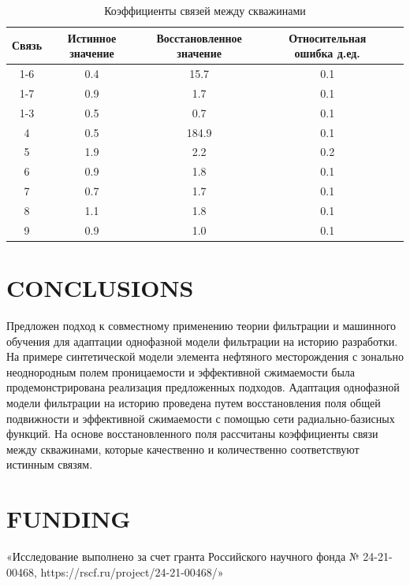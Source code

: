 \documentclass{article}
\begin{document}
	\begin{table}[h!]
	\caption{Коэффициенты связей между скважинами}	
	\label{tabl:connection}	
	\begin{center}
		\begin{tabular}{c|c|c|c|c}
			\hline
			Связь & Истинное значение & Восстановленное значение & Относительная ошибка д.ед. \\
			\hline
			1-6 & 0.4 & 15.7 & 0.1 \\
			1-7 & 0.9 & 1.7 & 0.1  \\
			1-3 & 0.5 & 0.7 & 0.1  \\
			4 & 0.5 & 184.9 & 0.1  \\
			5 & 1.9 & 2.2 & 0.2  \\
			6 & 0.9 & 1.8 & 0.1  \\
			7 & 0.7 & 1.7 & 0.1  \\
			8 & 1.1 & 1.8 & 0.1  \\
			9 & 0.9 & 1.0 & 0.1  \\
			\hline
			
		\end{tabular}
	\end{center}
\end{table}


\section{CONCLUSIONS}

Предложен подход к совместному применению теории фильтрации и машинного обучения для адаптации однофазной модели фильтрации на историю разработки. На примере синтетической модели элемента нефтяного месторождения с зонально неоднородным полем проницаемости и эффективной сжимаемости была продемонстрирована реализация предложенных подходов.
Адаптация однофазной модели фильтрации на историю проведена путем восстановления поля общей подвижности и эффективной сжимаемости с помощью сети радиально-базисных функций. На основе восстановленного поля рассчитаны коэффициенты связи между скважинами, которые качественно и количественно соответствуют истинным связям.

\section{FUNDING}
«Исследование выполнено за счет гранта Российского научного фонда № 24-21-00468,
 https://rscf.ru/project/24-21-00468/»
\end{document}
